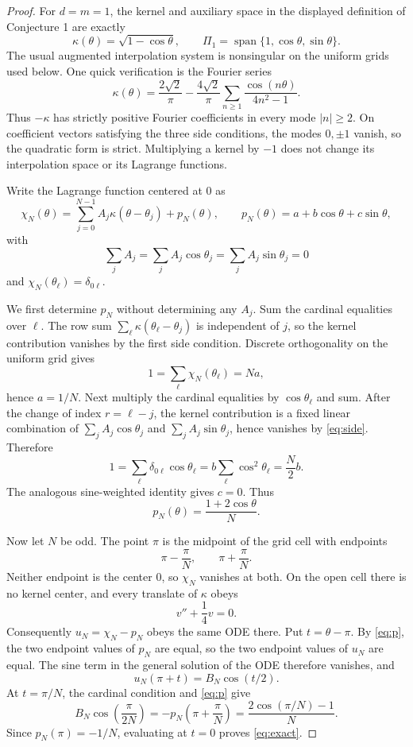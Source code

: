 \documentclass[11pt]{article}
\newcommand{\PiOne}{\Pi_1}
\begin{document}
\begin{proof}
For \(d=m=1\), the kernel and auxiliary space in the displayed definition of
Conjecture 1 are exactly
\[
 \kappa(\theta)=\sqrt{1-\cos\theta},\qquad
 \PiOne=\operatorname{span}\{1,\cos\theta,\sin\theta\}.
\]
The usual augmented interpolation system is nonsingular on the uniform grids
used below. One quick verification is the Fourier series
\[
 \kappa(\theta)=\frac{2\sqrt2}{\pi}
 -\frac{4\sqrt2}{\pi}\sum_{n\ge1}\frac{\cos(n\theta)}{4n^2-1}.
\]
Thus \(-\kappa\) has strictly positive Fourier coefficients in every mode
\(|n|\ge2\). On coefficient vectors satisfying the three side conditions,
the modes \(0,\pm1\) vanish, so the quadratic form is strict. Multiplying a
kernel by \(-1\) does not change its interpolation space or its Lagrange
functions.

Write the Lagrange function centered at \(0\) as
\begin{equation}\label{eq:representation}
 \chi_N(\theta)=\sum_{j=0}^{N-1}A_j\kappa(\theta-\theta_j)
 +p_N(\theta),
 \qquad p_N(\theta)=a+b\cos\theta+c\sin\theta,
\end{equation}
with
\begin{equation}\label{eq:side}
 \sum_jA_j=\sum_jA_j\cos\theta_j=\sum_jA_j\sin\theta_j=0
\end{equation}
and \(\chi_N(\theta_\ell)=\delta_{0\ell}\).

We first determine \(p_N\) without determining any \(A_j\). Sum the cardinal
equalities over \(\ell\). The row sum
\(\sum_\ell\kappa(\theta_\ell-\theta_j)\) is independent of \(j\), so the
kernel contribution vanishes by the first side condition. Discrete
orthogonality on the uniform grid gives
\[
 1=\sum_\ell\chi_N(\theta_\ell)=Na,
\]
hence \(a=1/N\). Next multiply the cardinal equalities by
\(\cos\theta_\ell\) and sum. After the change of index
\(r=\ell-j\), the kernel contribution is a fixed linear combination of
\(\sum_jA_j\cos\theta_j\) and \(\sum_jA_j\sin\theta_j\), hence vanishes by
\eqref{eq:side}. Therefore
\[
 1=\sum_\ell\delta_{0\ell}\cos\theta_\ell
   =b\sum_\ell\cos^2\theta_\ell=\frac N2b.
\]
The analogous sine-weighted identity gives \(c=0\). Thus
\begin{equation}\label{eq:p}
 p_N(\theta)=\frac{1+2\cos\theta}{N}.
\end{equation}

Now let \(N\) be odd. The point \(\pi\) is the midpoint of the grid cell with
endpoints
\[
 \pi-\frac\pi N,\qquad \pi+\frac\pi N.
\]
Neither endpoint is the center \(0\), so \(\chi_N\) vanishes at both. On the
open cell there is no kernel center, and every translate of \(\kappa\) obeys
\[
 v''+\frac14v=0.
\]
Consequently \(u_N=\chi_N-p_N\) obeys the same ODE there. Put
\(t=\theta-\pi\). By \eqref{eq:p}, the two endpoint values of \(p_N\) are
equal, so the two endpoint values of \(u_N\) are equal. The sine term in the
general solution of the ODE therefore vanishes, and
\[
 u_N(\pi+t)=B_N\cos(t/2).
\]
At \(t=\pi/N\), the cardinal condition and \eqref{eq:p} give
\[
 B_N\cos\left(\frac\pi{2N}\right)
 =-p_N\left(\pi+\frac\pi N\right)
 =\frac{2\cos(\pi/N)-1}{N}.
\]
Since \(p_N(\pi)=-1/N\), evaluating at \(t=0\) proves \eqref{eq:exact}.


\end{proof}
\end{document}
